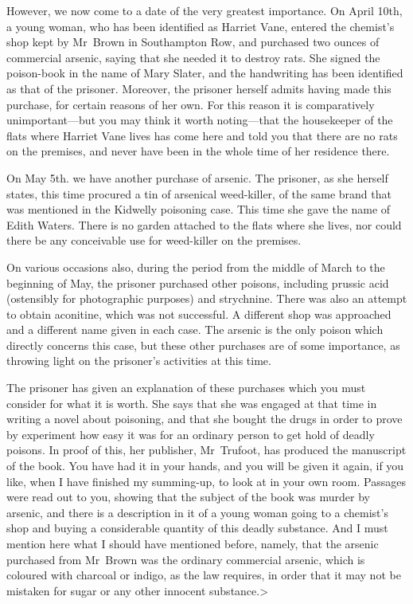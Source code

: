However, we now come to a date of the very greatest importance. On April 10th, a young woman, who has been identified as Harriet Vane, entered the chemist's shop kept by Mr~Brown in Southampton Row, and purchased two ounces of commercial arsenic, saying that she needed it to destroy rats. She signed the poison-book in the name of Mary Slater, and the handwriting has been identified as that of the prisoner. Moreover, the prisoner herself admits having made this purchase, for certain reasons of her own. For this reason it is comparatively unimportant—but you may think it worth noting—that the housekeeper of the flats where Harriet Vane lives has come here and told you that there are no rats on the premises, and never have been in the whole time of her residence there.

On May 5th. we have another purchase of arsenic. The prisoner, as she herself states, this time procured a tin of arsenical weed-killer, of the same brand that was mentioned in the Kidwelly poisoning case. This time she gave the name of Edith Waters. There is no garden attached to the flats where she lives, nor could there be any conceivable use for weed-killer on the premises.

On various occasions also, during the period from the middle of March to the beginning of May, the prisoner purchased other poisons, including prussic acid (ostensibly for photographic purposes) and strychnine. There was also an attempt to obtain aconitine, which was not successful. A different shop was approached and a different name given in each case. The arsenic is the only poison which directly concerns this case, but these other purchases are of some importance, as throwing light on the prisoner's activities at this time.

The prisoner has given an explanation of these purchases which you must consider for what it is worth. She says that she was engaged at that time in writing a novel about poisoning, and that she bought the drugs in order to prove by experiment how easy it was for an ordinary person to get hold of deadly poisons. In proof of this, her publisher, Mr~Trufoot, has produced the manuscript of the book. You have had it in your hands, and you will be given it again, if you like, when I have finished my summing-up, to look at in your own room. Passages were read out to you, showing that the subject of the book was murder by arsenic, and there is a description in it of a young woman going to a chemist's shop and buying a considerable quantity of this deadly substance. And I must mention here what I should have mentioned before, namely, that the arsenic purchased from Mr~Brown was the ordinary commercial arsenic, which is coloured with charcoal or indigo, as the law requires, in order that it may not be mistaken for sugar or any other innocent substance.>

